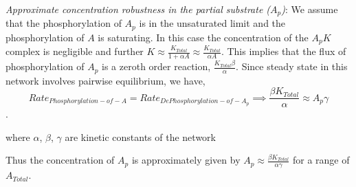 \documentclass[9pt,lineno]{elife}
\begin{document}
\begin{appendixbox}



\textit{Approximate concentration robustness in the partial substrate ($A_p$)}: We assume that the phosphorylation of $A_p$ is in the unsaturated limit and the phosphorylation of $A$ is saturating. In this case the concentration of the $A_pK$ complex is negligible and further $K \approx \frac{K_{Total}}{1+\alpha A} \approx \frac{K_{Total}}{\alpha A}$. This implies that the flux of phosphorylation of $A_p$ is a zeroth order reaction, $\frac{K_{Total} \beta}{\alpha}$. Since steady state in this network involves pairwise equilibrium, we have,  $$ Rate_{Phosphorylation-of-A} = Rate_{DePhosphorylation-of-A_p} \implies   \frac{\beta K_{Total}}{\alpha} \approx A_p {\gamma}$$. 

where $\alpha$, $\beta$, $\gamma$ are kinetic constants of the network

Thus the concentration of $A_p$ is approximately given by $A_p \approx \frac{\beta K_{Total}}{\alpha \gamma}$ for a range of $A_{Total}$.



\end{appendixbox}
\end{document}
